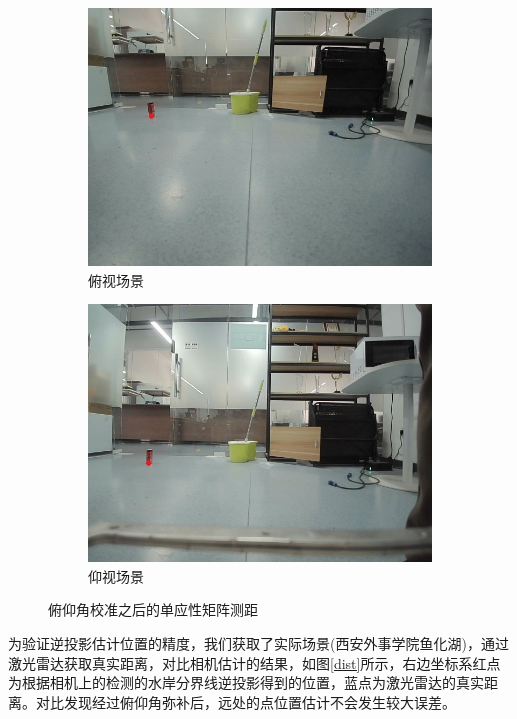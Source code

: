 \documentclass[cn,12pt,color=mine,scheme=chinese,bibstyle=gb7714-2015]{elegantbook}
\begin{document}
\begin{figure}[h]
	\centering
	\begin{subfigure}[b]{0.46\linewidth}
		\centering\includegraphics[width=\linewidth]{images/fushi1}
		\caption{\label{hom:a}俯视场景}
	\end{subfigure}
	\begin{subfigure}[b]{0.46\linewidth}
		\centering\includegraphics[width=\linewidth]{images/yangshi1}
		\caption{\label{hom:b}仰视场景}
	\end{subfigure}
	\caption{\label{hom2}俯仰角校准之后的单应性矩阵测距}
\end{figure}

\begin{note}[实际场景的测试]
	为验证逆投影估计位置的精度，我们获取了实际场景(西安外事学院鱼化湖)，通过激光雷达获取真实距离，对比相机估计的结果，如图\ref{dist}所示，右边坐标系红点为根据相机上的检测的水岸分界线逆投影得到的位置，蓝点为激光雷达的真实距离。对比发现经过俯仰角弥补后，远处的点位置估计不会发生较大误差。
\end{note}
\end{document}
